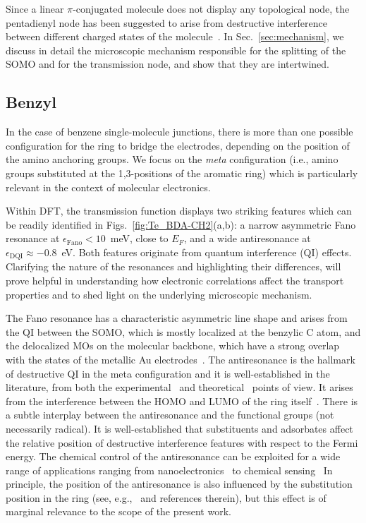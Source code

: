 \documentclass[aps,prx,twocolumn,superscriptaddress]{revtex4-2}
\begin{document}
Since a linear $\pi$-conjugated molecule does not display any topological node, 
the pentadienyl node has been suggested to arise 
from destructive interference 
between different charged states of the molecule~\cite{bergfield2011novel}.
In Sec.~\ref{sec:mechanism}, we discuss in detail the microscopic mechanism responsible 
for the splitting of the SOMO and for the transmission node, 
and show that they are intertwined. 
 



\subsection{Benzyl} 
In the case of benzene single-molecule junctions, there is more than one possible configuration 
for the ring to bridge the electrodes, 
depending on the position of the amino anchoring groups. 
We focus on the \emph{meta} configuration (i.e., amino groups substituted at the 1,3-positions of the aromatic ring) 
which is particularly relevant in the context of molecular electronics. 

Within DFT, the transmission function displays two striking features
which can be readily identified in Figs.~\ref{fig:Te_BDA-CH2}(a,b): 
a narrow asymmetric Fano resonance at $\epsilon_{\mathrm{Fano}}<10$~meV, 
close to $E_F$, 
and a wide antiresonance at $\epsilon_{\mathrm{DQI}}\approx -0.8$~eV.
Both features originate from quantum interference (QI) effects.
Clarifying the nature of the resonances and highlighting their differences, 
will prove helpful in understanding how electronic correlations affect the transport properties 
and to shed light on the underlying microscopic mechanism. 
 
The Fano resonance has a characteristic asymmetric line shape and arises from the QI between the SOMO, 
which is mostly localized at the benzylic C atom, %
and the delocalized MOs on the molecular backbone, 
which have a strong overlap with the states of the metallic Au electrodes~\cite{fanoPR124,miroshnichenkoRMP82,zhengAP61}. 
The antiresonance is the hallmark of destructive QI in the meta configuration 
and it is well-established in the literature, 
from both the experimental~\cite{arroyoAC125,yangCCL29,liNatMat18} 
and theoretical~\cite{sautetCPL153,solomonJCP129,samangNJP19,nozakiJPCC121,gunasekaranNL20} points of view. 
It arises from the interference between the HOMO and LUMO of the ring itself~\cite{gunasekaranNL20}. 
There is a subtle interplay between the antiresonance and the functional groups (not necessarily radical). 
It is well-established that substituents and adsorbates affect 
the relative position of destructive interference features with respect to the Fermi energy. 
The chemical control of the antiresonance can be exploited for a wide range of applications 
ranging from nanoelectronics~\cite{zhou2021substituent} to chemical sensing~\cite{prasongkit2016quantum,sengulPRB105enhancing}
In principle, the position of the antiresonance is also influenced 
by the substitution position in the ring (see, e.g.,~\cite{zhou2021substituent} and references therein), 
but this effect is of marginal relevance to the scope of the present work. 
\end{document}
